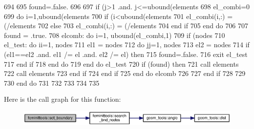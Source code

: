\begin{DoxyCode}
694           
695           found=.false.
696 
697            \textcolor{keywordflow}{if} (j>1 .and. j<=ubound(elements%
698             el\_combi=0
699             \textcolor{keywordflow}{do} i=1,ubound(elements%
700               \textcolor{keywordflow}{if} (i<ubound(elements%
701                 el\_combi(i,:) = (/elements%
702               \textcolor{keywordflow}{else}
703                 el\_combi(i,:) =  (/elements%
704 \textcolor{keywordflow}{              end if}
705 \textcolor{keywordflow}{            end do}
706             
707             found = .true.
708             elcomb: \textcolor{keywordflow}{do} i=1, ubound(el\_combi,1)
709               \textcolor{keywordflow}{if} (nodes%
710                 el\_test: \textcolor{keywordflow}{do} ii=1, nodes%
711                   el1 = nodes%
712                   \textcolor{keywordflow}{do} jj=1, nodes%
713                     el2 = nodes%
714                     \textcolor{keywordflow}{if} (el1==el2 .and. el1 /= el .and. el2 /= el) \textcolor{keywordflow}{then}
715                       found=.false.
716                       \textcolor{keywordflow}{exit} el\_test
717 \textcolor{keywordflow}{                    end if}
718 \textcolor{keywordflow}{                  end do} 
719 \textcolor{keywordflow}{                end do} el\_test
720                 \textcolor{keywordflow}{if} (found) \textcolor{keywordflow}{then}
721                   \textcolor{keyword}{call }elements%
722                   \textcolor{keyword}{call }elements%
723 \textcolor{keywordflow}{                end if}
724 \textcolor{keywordflow}{              end if}
725 \textcolor{keywordflow}{            end do} elcomb
726           
727 \textcolor{keywordflow}{          end if}
728             
729          
730 \textcolor{keywordflow}{        end do}
731         
732 
733 
734                
735 
\end{DoxyCode}


Here is the call graph for this function\+:\nopagebreak
\begin{figure}[H]
\begin{center}
\leavevmode
\includegraphics[width=350pt]{namespacefeminittools_a01c57c36680035f551a4f63b6b849a8a_cgraph}
\end{center}
\end{figure}





